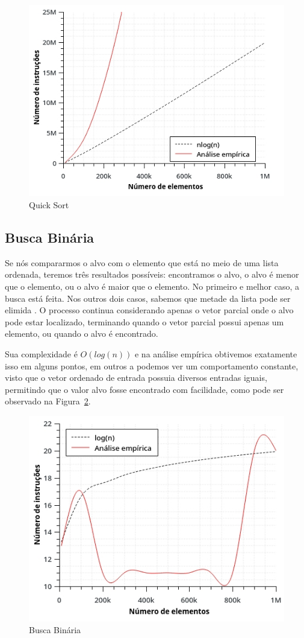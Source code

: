 \begin{figure}[ht]
\centering
\includegraphics[width=.5\textwidth]{images/quick_graph.jpg}
\caption{Quick Sort}
\label{fig:quick}
\end{figure}

\subsection{Busca Binária}
Se nós compararmos o alvo com o elemento que está no meio de uma lista ordenada, teremos três resultados possíveis: encontramos o alvo, o alvo é menor que o elemento, ou o alvo é maior que o elemento. No primeiro e melhor caso, a busca está feita. Nos outros dois casos, sabemos que metade da lista pode ser elimida \cite{mcconnell:01}. O processo continua considerando apenas o vetor parcial onde o alvo pode estar localizado, terminando quando o vetor parcial possui apenas um elemento, ou quando o alvo é encontrado.

Sua complexidade é $O(log(n))$ e na análise empírica obtivemos exatamente isso em alguns pontos, em outros a podemos ver um comportamento constante, visto que o vetor ordenado de entrada possuia diversos entradas iguais, permitindo que o valor alvo fosse encontrado com facilidade, como pode ser observado na Figura~\ref{fig:busca}.
\begin{figure}[ht]
\centering
\includegraphics[width=.5\textwidth]{images/binary_graph.jpg}
\caption{Busca Binária}
\label{fig:busca}
\end{figure}

